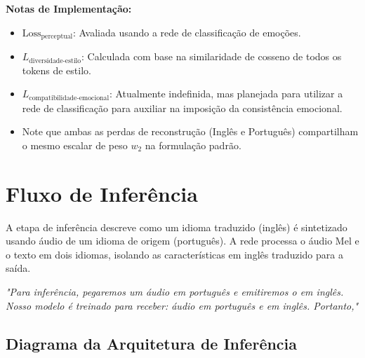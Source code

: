 \documentclass[11pt]{article}
\begin{document}
\textbf{Notas de Implementação:}
\begin{itemize}
    \item $\text{Loss}_{\text{perceptual}}$: Avaliada usando a rede de classificação de emoções.
    \item $L_{\text{diversidade-estilo}}$: Calculada com base na similaridade de cosseno de todos os tokens de estilo.
    \item $L_{\text{compatibilidade-emocional}}$: Atualmente indefinida, mas planejada para utilizar a rede de classificação para auxiliar na imposição da consistência emocional.
    \item Note que ambas as perdas de reconstrução (Inglês e Português) compartilham o mesmo escalar de peso $w_2$ na formulação padrão.
\end{itemize}

\section{Fluxo de Inferência}

A etapa de inferência descreve como um idioma traduzido (inglês) é sintetizado usando áudio de um idioma de origem (português). A rede processa o áudio Mel e o texto em dois idiomas, isolando as características em inglês traduzido para a saída.

\textit{"Para inferência, pegaremos um áudio em português e emitiremos o em inglês. Nosso modelo é treinado para receber: áudio em português e em inglês. Portanto,"}

\subsection{Diagrama da Arquitetura de Inferência}
\end{document}

